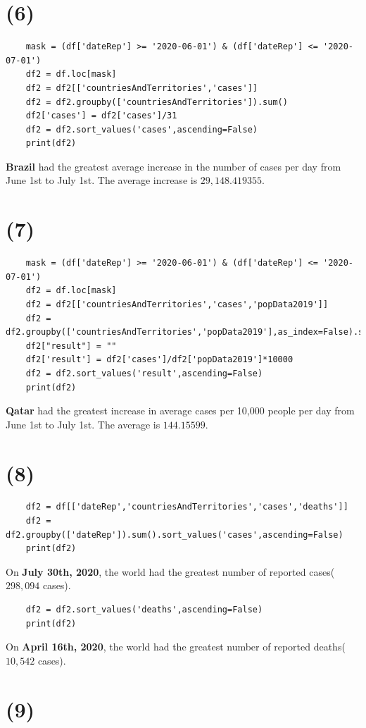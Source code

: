 \documentclass[12pt]{article}
\begin{document}
\section*{(6)}
\begin{lstlisting}
    mask = (df['dateRep'] >= '2020-06-01') & (df['dateRep'] <= '2020-07-01')
    df2 = df.loc[mask]
    df2 = df2[['countriesAndTerritories','cases']]
    df2 = df2.groupby(['countriesAndTerritories']).sum()
    df2['cases'] = df2['cases']/31
    df2 = df2.sort_values('cases',ascending=False)
    print(df2)
\end{lstlisting}
\textbf{Brazil} had the greatest average increase in the number of cases per day from June 1st to July 1st. The average increase is $29,148.419355$.

\section*{(7)}
\begin{lstlisting}
    mask = (df['dateRep'] >= '2020-06-01') & (df['dateRep'] <= '2020-07-01')
    df2 = df.loc[mask]
    df2 = df2[['countriesAndTerritories','cases','popData2019']]
    df2 = df2.groupby(['countriesAndTerritories','popData2019'],as_index=False).sum()
    df2["result"] = ""
    df2['result'] = df2['cases']/df2['popData2019']*10000
    df2 = df2.sort_values('result',ascending=False)
    print(df2)
\end{lstlisting}
\textbf{Qatar} had the greatest increase in average cases per 10,000 people per day from June 1st to July 1st. The average is $144.15599$.

\section*{(8)}
\begin{lstlisting}
    df2 = df[['dateRep','countriesAndTerritories','cases','deaths']]
    df2 = df2.groupby(['dateRep']).sum().sort_values('cases',ascending=False)
    print(df2)
\end{lstlisting}
On \textbf{July 30th, 2020}, the world had the greatest number of reported cases($298,094$ cases).
\begin{lstlisting}
    df2 = df2.sort_values('deaths',ascending=False)
    print(df2)
\end{lstlisting}
On \textbf{April 16th, 2020}, the world had the greatest number of reported deaths($10,542$ cases).


\section*{(9)}
\end{document}
